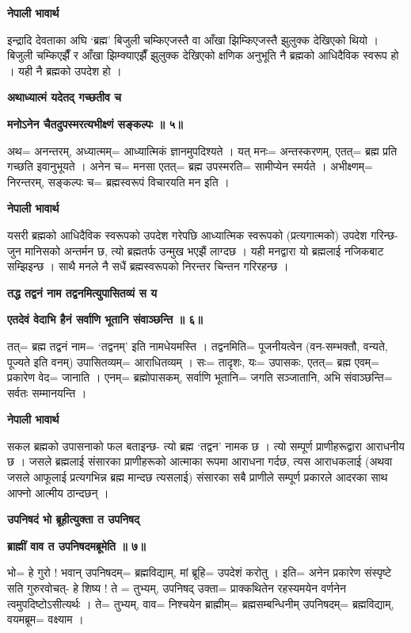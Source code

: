 \documentclass[11pt, a5paper]{article}
\begin{document}
\textbf{नेपाली भावार्थ}

इन्द्रादि देवताका अघि ‘ब्रह्म’ बिजुली चम्किएजस्तै वा आँखा झिम्किएजस्तै झुलुक्क देखिएको थियो । बिजुली चम्किएझैँ र आँखा झिम्क्याएझैँ झुलुक्क देखिएको क्षणिक अनुभूति नै ब्रह्मको आधिदैविक स्वरूप हो । यही नै ब्रह्मको उपदेश हो ।

\textbf{अथाध्यात्मं यदेतद् गच्छतीव  च}

\textbf{मनोऽनेन चैतदुपस्मरत्यभीक्ष्णं सङ्कल्पः ॥ ५॥}

अथ= अनन्तरम्, अध्यात्मम्= आध्यात्मिकं ज्ञानमुपदिश्यते । यत् मनः= अन्तस्करणम्, एतत्= ब्रह्म प्रति गच्छति इवानुभूयते । अनेन च= मनसा एतत्= ब्रह्म उपस्मरति= सामीप्येन स्मर्यते । अभीक्ष्णम्= निरन्तरम्, सङ्कल्पः च= ब्रह्मस्वरूपं विचारयति मन इति ।

\textbf{नेपाली भावार्थ}

यसरी ब्रह्मको आधिदैविक स्वरूपको उपदेश गरेपछि आध्यात्मिक स्वरूपको (प्रत्यगात्मको) उपदेश गरिन्छ- जुन मानिसको अन्तर्मन छ, त्यो ब्रह्मतर्फ उन्मुख भएझैं लाग्दछ । यही मनद्वारा यो ब्रह्मलाई नजिकबाट सम्झिइन्छ । साथै मनले नै सधैं ब्रह्मस्वरूपको निरन्तर चिन्तन गरिरहन्छ ।

\textbf{तद्ध तद्वनं नाम  तद्वनमित्युपासितव्यं स य}

\textbf{एतदेवं वेदाभि हैनं सर्वाणि भूतानि संवाञ्छन्ति ॥ ६॥}

तत्= ब्रह्म तद्वनं नाम= ‘तद्वनम्’ इति नामधेयमस्ति । तद्वनमिति= पूजनीयत्वेन (वन-सम्भक्तौ, वन्यते, पूज्यते इति वनम्) उपासितव्यम्= आराधितव्यम् ।  सः= तादृशः, यः= उपासकः, एतत्= ब्रह्म एवम्= प्रकारेण वेद= जानाति । एनम्= ब्रह्मोपासकम्, सर्वाणि भूतानि= जगति सञ्जातानि, अभि संवाञ्छन्ति= सर्वतः सम्मानयन्ति ।

\textbf{नेपाली भावार्थ}

सकल ब्रह्मको उपासनाको फल बताइन्छ- त्यो ब्रह्म ‘तद्वन’ नामक छ । त्यो सम्पूर्ण प्राणीहरूद्वारा आराधनीय छ । जसले ब्रह्मलाई संसारका प्राणीहरूको आत्माका रूपमा आराधना गर्दछ, त्यस आराधकलाई (अथवा जसले आफूलाई प्रत्यगभिन्न ब्रह्म मान्दछ त्यसलाई) संसारका सबै प्राणीले सम्पूर्ण प्रकारले आदरका साथ आफ्नो आत्मीय ठान्दछन् ।

\textbf{उपनिषदं भो ब्रूहीत्युक्ता त उपनिषद्}

\textbf{ब्राह्मीं वाव त उपनिषदमब्रूमेति ॥ ७॥}

भो= हे गुरो ! भवान् उपनिषदम्= ब्रह्मविद्याम्, मां ब्रूहि= उपदेशं करोतु । इति= अनेन प्रकारेण संस्पृष्टे सति गुरुरवोचत्- हे शिष्य ! ते = तुभ्यम्, उपनिषद् उक्ता= प्राक्कथितेन रहस्यमयेन वर्णनेन त्वमुपदिष्टोऽसीत्यर्थः । ते= तुभ्यम्, वाव= निश्चयेन ब्राह्मीम्= ब्रह्मसम्बन्धिनीम् उपनिषदम्= ब्रह्मविद्याम्, वयमब्रूम= वक्ष्याम ।
\end{document}
